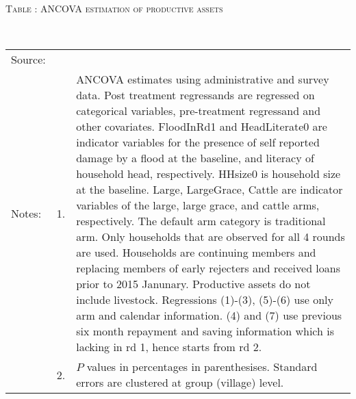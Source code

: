 \hspace{-1cm}\begin{minipage}[t]{14cm}
\hfil\textsc{\normalsize Table \thetable: ANCOVA estimation of productive assets\label{tab ANCOVA productive assets}}\\
\setlength{\tabcolsep}{1pt}
\setlength{\baselineskip}{8pt}
\renewcommand{\arraystretch}{.55}
\hfil{}\\
\renewcommand{\arraystretch}{.8}
\setlength{\tabcolsep}{1pt}
\begin{tabular}{>{\hfill\scriptsize}p{1cm}<{}>{\hfill\scriptsize}p{.25cm}<{}>{\scriptsize}p{12cm}<{\hfill}}
Source:& \multicolumn{2}{l}{\scriptsize Estimated with GUK administrative and survey data.}\\
Notes: & 1. & ANCOVA estimates using administrative and survey data. Post treatment regressands are regressed on categorical variables, pre-treatment regressand and other covariates. \textsf{FloodInRd1} and \textsf{HeadLiterate0} are indicator variables for the presence of self reported damage by a flood at the baseline, and literacy of household head, respectively. \textsf{HHsize0} is household size at the baseline. \textsf{Large}, \textsf{LargeGrace}, \textsf{Cattle} are indicator variables of the \textsf{large}, \textsf{large grace}, and \textsf{cattle} arms, respectively. The default arm category is \textsf{traditional} arm. Only households that are observed for all 4 rounds are used. Households are continuing members and replacing members of early rejecters and received loans prior to 2015 Janunary. Productive assets do not include livestock. Regressions (1)-(3), (5)-(6) use only arm and calendar information. (4) and (7) use previous six month repayment and saving information which is lacking in rd 1, hence starts from rd 2.\\
& 2. & $P$ values in percentages in parenthesises. Standard errors are clustered at group (village) level.
\end{tabular}
\end{minipage}

